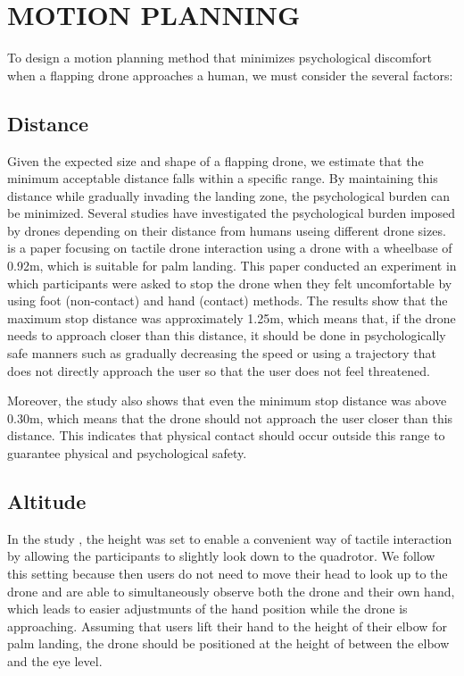 \section{MOTION PLANNING}
\label{sec:motion-planning}

To design a motion planning method that minimizes psychological discomfort when a flapping drone approaches a human, we must consider the several factors:

\subsection{Distance}
\label{sec:distance}
Given the expected size and shape of a flapping drone, we estimate that the minimum acceptable distance falls within a specific range. By maintaining this distance while gradually invading the landing zone, the psychological burden can be minimized.
Several studies have investigated the psychological burden imposed by drones depending on their distance from humans useing different drone sizes\cite{Yeh2017Proxemics, lieser2021evaluating-distances,Duncan2013comfortable-approach, Acharya2017robot-vs-drone-comfort}.
\cite{lieser2021evaluating-distances} is a paper focusing on tactile drone interaction using a drone with a wheelbase of 0.92m, which is suitable for palm landing.
This paper conducted an experiment in which participants were asked to stop the drone when they felt uncomfortable by using foot (non-contact) and hand (contact) methods.
The results show that the maximum stop distance was approximately 1.25m,
which means that, if the drone needs to approach closer than this distance, it should be done in psychologically safe manners such as gradually decreasing the speed or using a trajectory that does not directly approach the user so that the user does not feel threatened.

Moreover, the study \cite{lieser2021evaluating-distances} also shows that even the minimum stop distance was above 0.30m, which means that the drone should not approach the user closer than this distance.
This indicates that physical contact should occur outside this range to guarantee physical and psychological safety.

\subsection{Altitude}

In the study \cite{lieser2021evaluating-distances}, the height was set to enable a convenient way of tactile interaction 
by allowing the participants to slightly look down to the quadrotor.
We follow this setting because then users do not need to move their head to look up to the drone and are able to simultaneously observe both the drone and their own hand, 
which leads to easier adjustmunts of the hand position while the drone is approaching.
Assuming that users lift their hand to the height of their elbow for palm landing, the drone should be positioned at the height of between the elbow and the eye level.

